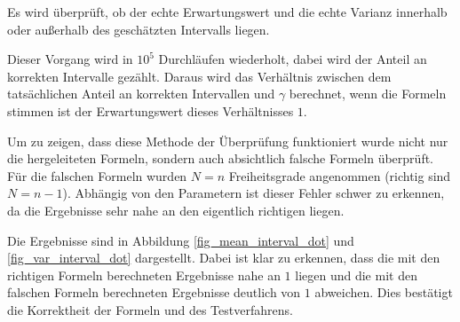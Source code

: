 \documentclass[10pt,twocolumn]{scrartcl}
\begin{document}
		Es wird überprüft, ob der echte Erwartungswert und die echte Varianz innerhalb oder außerhalb des geschätzten Intervalls liegen.

		Dieser Vorgang wird in $10^5$ Durchläufen wiederholt, dabei wird der Anteil an korrekten Intervalle gezählt. Daraus wird das Verhältnis zwischen dem tatsächlichen Anteil an korrekten Intervallen und $\gamma$ berechnet, wenn die Formeln stimmen ist der Erwartungswert dieses Verhältnisses $1$.

		Um zu zeigen, dass diese Methode der Überprüfung funktioniert wurde nicht nur die hergeleiteten Formeln, sondern auch absichtlich falsche Formeln überprüft. Für die falschen Formeln wurden $N = n$ Freiheitsgrade angenommen (richtig sind $N = n-1$). Abhängig von den Parametern ist dieser Fehler schwer zu erkennen, da die Ergebnisse sehr nahe an den eigentlich richtigen liegen.

		Die Ergebnisse sind in Abbildung \ref{fig_mean_interval_dot} und \ref{fig_var_interval_dot} dargestellt. Dabei ist klar zu erkennen, dass die mit den richtigen Formeln berechneten Ergebnisse nahe an $1$ liegen und die mit den falschen Formeln berechneten Ergebnisse deutlich von $1$ abweichen. Dies bestätigt die Korrektheit der Formeln und des Testverfahrens.
\end{document}
